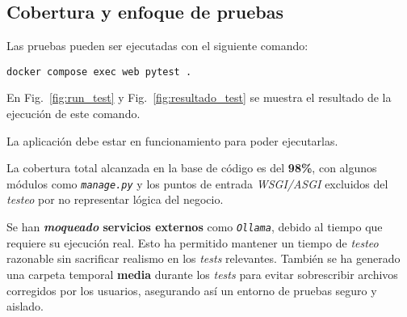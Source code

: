 \subsection*{Cobertura y enfoque de pruebas}

Las pruebas pueden ser ejecutadas con el siguiente comando:
\begin{verbatim}
docker compose exec web pytest .
\end{verbatim}
En Fig.~\ref{fig:run_test} y Fig.~\ref{fig:resultado_test} se muestra el resultado de la ejecución de este comando.

La aplicación debe estar en funcionamiento para poder ejecutarlas.


La cobertura total alcanzada en la base de código es del \textbf{98\%}, con algunos módulos como \texttt{\emph{manage.py}} y los puntos de entrada \textit{WSGI/ASGI} excluidos del \textit{testeo} por no representar lógica del negocio.

Se han \textbf{\textit{moqueado} servicios externos} como \texttt{\textit{Ollama}}, debido al tiempo que requiere su ejecución real. Esto ha permitido mantener un tiempo de \textit{testeo} razonable sin sacrificar realismo en los \textit{tests} relevantes. También se ha generado una carpeta temporal \textbf{media} durante los \textit{tests} para evitar sobrescribir archivos corregidos por los usuarios, asegurando así un entorno de pruebas seguro y aislado.

